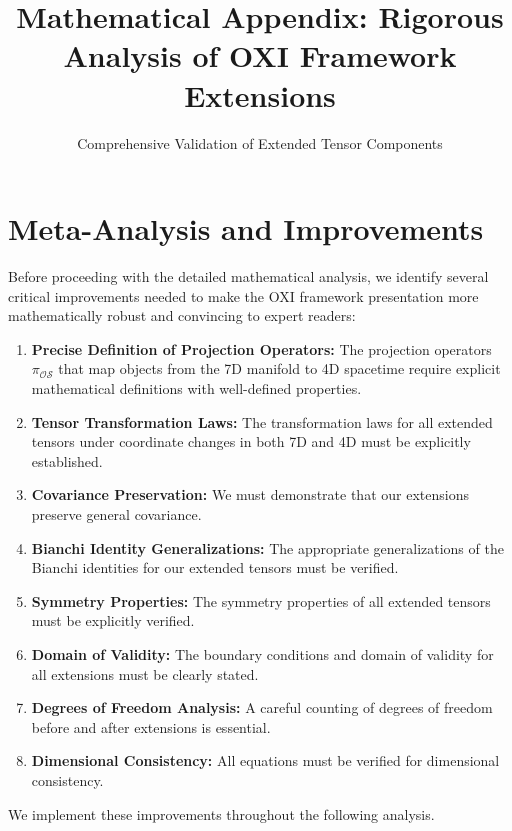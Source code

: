 \documentclass{article}
\title{Mathematical Appendix: Rigorous Analysis of OXI Framework Extensions}
\author{Comprehensive Validation of Extended Tensor Components}
\date{}
\begin{document}
\maketitle

\section*{Meta-Analysis and Improvements}

Before proceeding with the detailed mathematical analysis, we identify several critical improvements needed to make the OXI framework presentation more mathematically robust and convincing to expert readers:

\begin{enumerate}
\item \textbf{Precise Definition of Projection Operators:} The projection operators $\pi_{\mathcal{OS}}$ that map objects from the 7D manifold to 4D spacetime require explicit mathematical definitions with well-defined properties.

\item \textbf{Tensor Transformation Laws:} The transformation laws for all extended tensors under coordinate changes in both 7D and 4D must be explicitly established.

\item \textbf{Covariance Preservation:} We must demonstrate that our extensions preserve general covariance.

\item \textbf{Bianchi Identity Generalizations:} The appropriate generalizations of the Bianchi identities for our extended tensors must be verified.

\item \textbf{Symmetry Properties:} The symmetry properties of all extended tensors must be explicitly verified.

\item \textbf{Domain of Validity:} The boundary conditions and domain of validity for all extensions must be clearly stated.

\item \textbf{Degrees of Freedom Analysis:} A careful counting of degrees of freedom before and after extensions is essential.

\item \textbf{Dimensional Consistency:} All equations must be verified for dimensional consistency.
\end{enumerate}

We implement these improvements throughout the following analysis.
\end{document}
